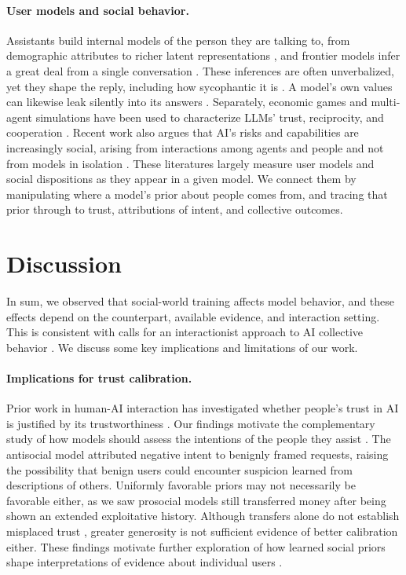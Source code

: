 \documentclass{article} %
\newcounter{finding}
\begin{document}
\paragraph{User models and social behavior.}
Assistants build internal models of the person they are talking to, from demographic attributes \citep{chen2024designing} to richer latent representations \citep{choi2025user}, and frontier models infer a great deal from a single conversation \citep{zhong2026awareness}. These inferences are often unverbalized, yet they shape the reply, including how sycophantic it is \mbox{\citep{cheng2026verbalizing}}. A model's own values can likewise leak silently into its answers \citep{betley2026value}. Separately, economic games and multi-agent simulations have been used to characterize LLMs' trust, reciprocity, and cooperation \citep{xie2024canllm, mei2024turing, akata2025playing, piatti2024cooperate}. Recent work also argues that AI's risks and capabilities are increasingly social, arising from interactions among agents and people and not from models in isolation \citep{hammond2025multi, ferrarotti2026interactionist, evans2026agentic}. These literatures largely measure user models and social dispositions as they appear in a given model. We connect them by manipulating where a model's prior about people comes from, and tracing that prior through to trust, attributions of intent, and collective outcomes.

\section{Discussion}
\label{sec:discussion}
In sum, we observed that social-world training affects model behavior, and these effects depend on the counterpart, available evidence, and interaction setting. This is consistent with calls for an interactionist approach to AI collective behavior \citep{ferrarotti2026interactionist}. We discuss some key implications and limitations of our work.

\paragraph{Implications for trust calibration.}
Prior work in human-AI interaction has investigated whether people's trust in AI is justified by its trustworthiness \citep{jacovi2021formalizing, amershi2019guidelines}. Our findings motivate the complementary study of how models should assess the intentions of the people they assist \citep{choi2025user, zhong2026awareness}. The antisocial model attributed negative intent to benignly framed requests, raising the possibility that benign users could encounter suspicion learned from descriptions of others. Uniformly favorable priors may not necessarily be favorable either, as we saw prosocial models still transferred money after being shown an extended exploitative history. Although transfers alone do not establish misplaced trust \citep{cox2004identify}, greater generosity is not sufficient evidence of better calibration either. These findings motivate further exploration of how learned social priors shape interpretations of evidence about individual users \citep{zheng2026useless, sun2025case}.
\end{document}
